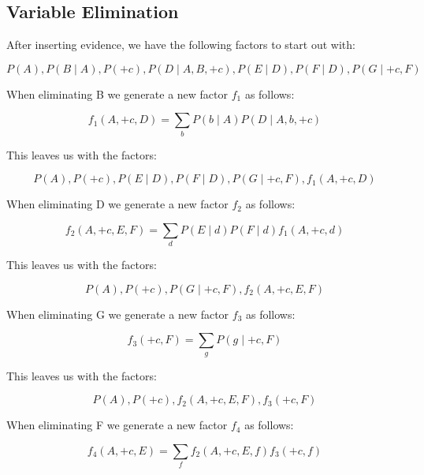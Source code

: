 \documentclass[11pt, answers]{exam}
\begin{document}
\begin{questions}
\section{Variable Elimination}
\question


After inserting evidence, we have the following factors to start out with:


	\begin{solution}
    $$P(A), P(B \mid A), P(+c), P(D \mid A, B,+c), P(E \mid D), P(F \mid D), P(G \mid+c, F)$$
	\end{solution}

When eliminating B we generate a new factor $f_1$ as follows:
	\begin{solution}
	$$f_{1}(A,+c, D)=\sum_{b} P(b \mid A) P(D \mid A, b,+c)$$
	\end{solution}
	
This leaves us with the factors:
	\begin{solution}
	$$P(A), P(+c), P(E \mid D), P(F \mid D), P(G \mid+c, F), f_{1}(A,+c, D)$$
	\end{solution}
	
When eliminating D we generate a new factor $f_2$ as follows:
	\begin{solution}
	$$f_{2}(A, +c, E, F)=\sum_{d} P(E \mid d) P(F \mid d) f_1(A, +c, d)$$
	\end{solution}
	
\newpage
This leaves us with the factors:
	\begin{solution}
	$$P(A), P(+c), P(G \mid+c, F), f_{2}(A, +c, E, F)$$
	\end{solution}
	
When eliminating G we generate a new factor $f_3$ as follows:
	\begin{solution}
	$$f_{3}(+c, F)=\sum_{g} P(g \mid +c, F)$$
	\end{solution}

This leaves us with the factors:

	\begin{solution}
	$$P(A), P(+c), f_{2}(A, +c, E, F), f_{3}(+c, F)$$
	\end{solution}
	
When eliminating F we generate a new factor $f_4$ as follows:

	\begin{solution}
	$$f_{4}(A, +c, E)=\sum_{f} f_{2}(A, +c, E, f) f_{3}(+c, f)$$
	\end{solution}
	

\end{questions}
\end{document}
